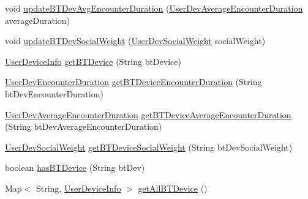 \begin{DoxyCompactItemize}
\item 
void \hyperlink{classcom_1_1copelabs_1_1oiframework_1_1socialproximity_1_1_data_base_a9f92a446dc6d0c20490d19c5ba4a8bb9}{update\+B\+T\+Dev\+Avg\+Encounter\+Duration} (\hyperlink{classcom_1_1copelabs_1_1oiframework_1_1socialproximity_1_1_user_dev_average_encounter_duration}{User\+Dev\+Average\+Encounter\+Duration} average\+Duration)
\item 
void \hyperlink{classcom_1_1copelabs_1_1oiframework_1_1socialproximity_1_1_data_base_abeb680d3e4601abd86e742fc749856ad}{update\+B\+T\+Dev\+Social\+Weight} (\hyperlink{classcom_1_1copelabs_1_1oiframework_1_1socialproximity_1_1_user_dev_social_weight}{User\+Dev\+Social\+Weight} social\+Weight)
\item 
\hyperlink{classcom_1_1copelabs_1_1oiframework_1_1socialproximity_1_1_user_device_info}{User\+Device\+Info} \hyperlink{classcom_1_1copelabs_1_1oiframework_1_1socialproximity_1_1_data_base_ae9bc9ae214f26e37a6e7f9e1f12cfb6a}{get\+B\+T\+Device} (String bt\+Device)
\item 
\hyperlink{classcom_1_1copelabs_1_1oiframework_1_1socialproximity_1_1_user_dev_encounter_duration}{User\+Dev\+Encounter\+Duration} \hyperlink{classcom_1_1copelabs_1_1oiframework_1_1socialproximity_1_1_data_base_a8cd70ae38c8384f642b3192a971e3e88}{get\+B\+T\+Device\+Encounter\+Duration} (String bt\+Dev\+Encounter\+Duration)
\item 
\hyperlink{classcom_1_1copelabs_1_1oiframework_1_1socialproximity_1_1_user_dev_average_encounter_duration}{User\+Dev\+Average\+Encounter\+Duration} \hyperlink{classcom_1_1copelabs_1_1oiframework_1_1socialproximity_1_1_data_base_ae7d4df4a3f0301ea4ccd80b49b0a2c9f}{get\+B\+T\+Device\+Average\+Encounter\+Duration} (String bt\+Dev\+Average\+Encounter\+Duration)
\item 
\hyperlink{classcom_1_1copelabs_1_1oiframework_1_1socialproximity_1_1_user_dev_social_weight}{User\+Dev\+Social\+Weight} \hyperlink{classcom_1_1copelabs_1_1oiframework_1_1socialproximity_1_1_data_base_a8daece6c9646b247d3b9534f0843481c}{get\+B\+T\+Device\+Social\+Weight} (String bt\+Dev\+Social\+Weight)
\item 
boolean \hyperlink{classcom_1_1copelabs_1_1oiframework_1_1socialproximity_1_1_data_base_a71d2823fa419b59a910166711f5bb1e4}{has\+B\+T\+Device} (String bt\+Dev)
\item 
Map$<$ String, \hyperlink{classcom_1_1copelabs_1_1oiframework_1_1socialproximity_1_1_user_device_info}{User\+Device\+Info} $>$ \hyperlink{classcom_1_1copelabs_1_1oiframework_1_1socialproximity_1_1_data_base_a63fa5a7d57ba117a2f37d97b6e409ed3}{get\+All\+B\+T\+Device} ()

\end{DoxyCompactItemize}
